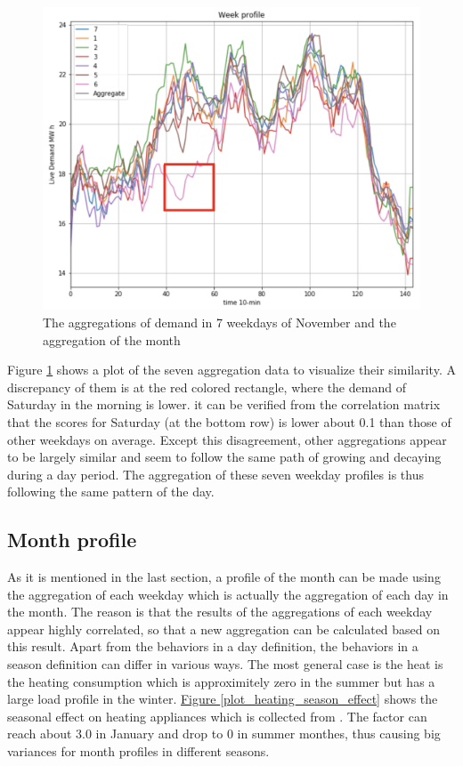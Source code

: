 \documentclass[12pt,a4paper]{report}
\begin{document}
                \begin{figure}[ht]
                    \centerline{\includegraphics[scale=1.4]{weekday_profile}}
                    \caption{The aggregations of demand in 7 weekdays of November and the aggregation of the month}
                    \label{plot_week_profile}
                \end{figure}
                
                Figure \ref{plot_week_profile} shows a plot of the seven aggregation data to visualize their similarity. A discrepancy of them is at the red colored rectangle, where the demand of Saturday in the morning is lower. it can be verified from the correlation matrix that the scores for Saturday (at the bottom row) is lower about 0.1 than those of other weekdays on average. Except this disagreement, other aggregations appear to be largely similar and seem to follow the same path of growing and decaying during a day period. The aggregation of these seven weekday profiles is thus following the same pattern of the day.

                \subsection{Month profile}

                As it is mentioned in the last section, a profile of the month can be made using the aggregation of each weekday which is actually the aggregation of each day in the month. The reason is that the results of the aggregations of each weekday appear highly correlated, so that a new aggregation can be calculated based on this result. Apart from the behaviors in a day definition, the behaviors in a season definition can differ in various ways. The most general case is the heat is the heating consumption which is approximitely zero in the summer but has a large load profile in the winter. \hyperref[plot_heating_season_effect]{Figure \ref*{plot_heating_season_effect}} shows the seasonal effect on heating appliances which is collected from \cite{report:household}. The factor can reach about 3.0 in January and drop to 0 in summer monthes, thus causing big variances for month profiles in different seasons.
\end{document}
